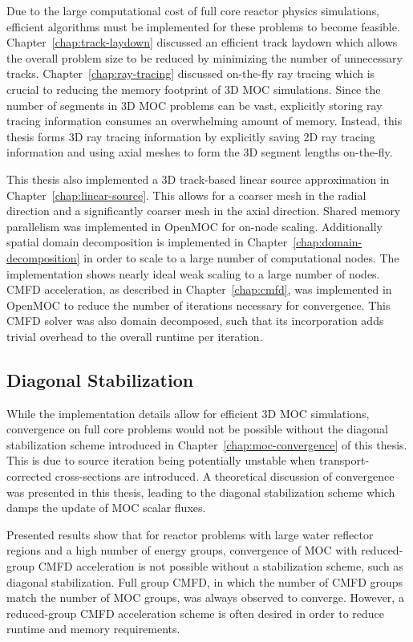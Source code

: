 Due to the large computational cost of full core reactor physics simulations, efficient algorithms must be implemented for these problems to become feasible. Chapter~\ref{chap:track-laydown} discussed an efficient track laydown which allows the overall problem size to be reduced by minimizing the number of unnecessary tracks. Chapter~\ref{chap:ray-tracing} discussed on-the-fly ray tracing which is crucial to reducing the memory footprint of 3D \ac{MOC} simulations. Since the number of segments in 3D \ac{MOC} problems can be vast, explicitly storing ray tracing information consumes an overwhelming amount of memory. Instead, this thesis forms 3D ray tracing information by explicitly saving 2D ray tracing information and using axial meshes to form the 3D segment lengths on-the-fly.

This thesis also implemented a 3D track-based linear source approximation in Chapter~\ref{chap:linear-source}. This allows for a coarser mesh in the radial direction and a significantly coarser mesh in the axial direction. Shared memory parallelism was implemented in OpenMOC for on-node scaling. Additionally spatial domain decomposition is implemented in Chapter~\ref{chap:domain-decomposition} in order to scale to a large number of computational nodes. The implementation shows nearly ideal weak scaling to a large number of nodes. \ac{CMFD} acceleration, as described in Chapter~\ref{chap:cmfd}, was implemented in OpenMOC to reduce the number of iterations necessary for convergence. This \ac{CMFD} solver was also domain decomposed, such that its incorporation adds trivial overhead to the overall runtime per iteration.


\subsection{Diagonal Stabilization}
\label{sec:sub:diag-stab}

While the implementation details allow for efficient 3D \ac{MOC} simulations, convergence on full core problems would not be possible without the diagonal stabilization scheme introduced in Chapter~\ref{chap:moc-convergence} of this thesis. This is due to source iteration being potentially unstable when transport-corrected cross-sections are introduced. A theoretical discussion of convergence was presented in this thesis, leading to the diagonal stabilization scheme which damps the update of \ac{MOC} scalar fluxes.

Presented results show that for reactor problems with large water reflector regions and a high number of energy groups, convergence of \ac{MOC} with reduced-group \ac{CMFD} acceleration is not possible without a stabilization scheme, such as diagonal stabilization. Full group \ac{CMFD}, in which the number of \ac{CMFD} groups match the number of \ac{MOC} groups, was always observed to converge. However, a reduced-group \ac{CMFD} acceleration scheme is often desired in order to reduce runtime and memory requirements.

